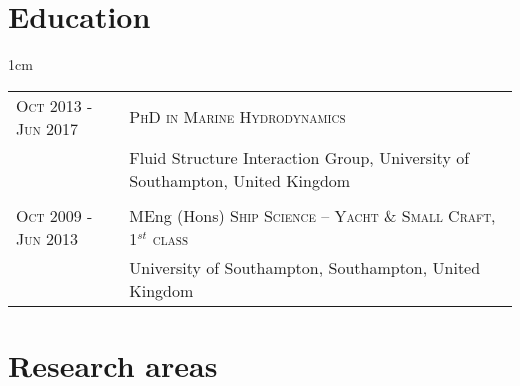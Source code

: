 \documentclass[a4paper,10pt]{article}
\begin{document}

\section{Education}

\begin{minipage}{\textwidth}
\begin{adjustwidth}{}{1cm}

\begin{tabular}{p{3.8cm} p{12.5cm}}

\textsc{Oct 2013 - Jun 2017} & \textsc{PhD in Marine Hydrodynamics} \\
							& Fluid Structure Interaction Group, University of Southampton, United Kingdom \\
\\

\textsc{Oct 2009 - Jun 2013} & MEng (Hons) \textsc{Ship Science – Yacht \& Small Craft, 1$^{st}$ class} \\
& University of Southampton, Southampton, United Kingdom \\

\end{tabular}

\end{adjustwidth}
\end{minipage}


\section{Research areas}
\end{document}
